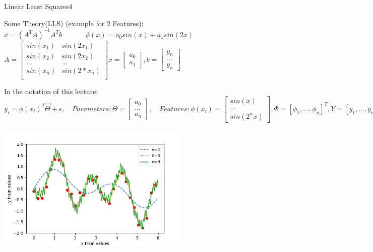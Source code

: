 \begin{questions}
\begin{question}{Linear Least Squares}{4}
	\begin{answer}
	Some Theory(LLS) (example for 2 Features): \\
	$x = (A^T A)^{-1} A^T b \quad \qquad$ 
	$\phi(x)=a_0 sin(x)+a_1 sin(2x) \qquad \qquad$
	$A=\begin{bmatrix}sin(x_1) & sin(2 x_1) \\ sin(x_2) & sin(2 x_2)\\ ...&...\\sin(x_n) &sin(2*x_n)\\ \end{bmatrix} x=\begin{bmatrix} a_0 \\ a_1 \end{bmatrix},b=\begin{bmatrix} y_0 \\...\\ y_n \end{bmatrix}$
	
	In the notation of this lecture:\\
	$y_i = \phi (x_i)^T \vec{\Theta}+\epsilon, \quad Parameters: \Theta = \begin{bmatrix}
	a_0\\...\\ a_n
	\end{bmatrix},\quad Features:\phi (x_i)=\begin{bmatrix}
	sin(x)\\...\\sin(2^n x)
	\end{bmatrix}, \Phi=[\phi_1, ..., \phi_n]^T, Y = [y_1, ..., y_n]^T, \quad \Theta = (\Phi^T \Phi)^{-1} \Phi^T Y$
	
	\begin{center}
		\includegraphics[width=0.7\textwidth]{img/3c.png} 
	\end{center}
	
	\end{answer}
		

\end{question}
\end{questions}
